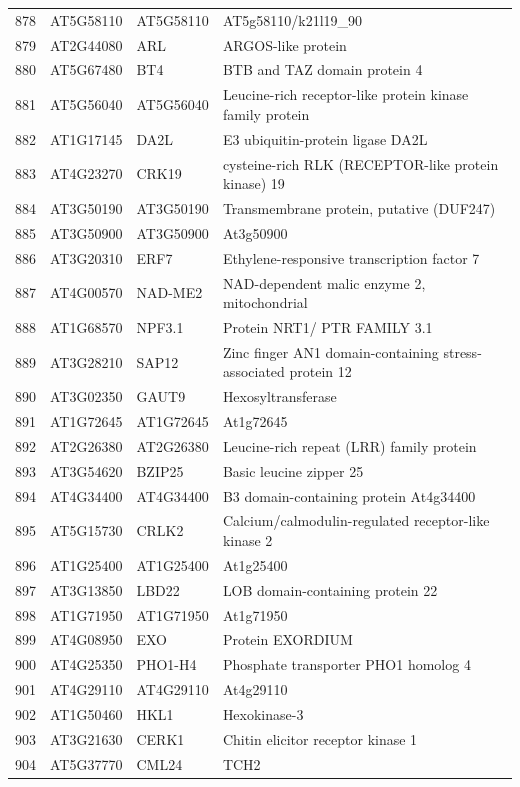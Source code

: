 \documentclass[11pt]{article}
\begin{document}
\begin{center}
\begin{tabular}{rlll}
878 & AT5G58110 & AT5G58110 & AT5g58110/k21l19\_90\\
879 & AT2G44080 & ARL & ARGOS-like protein\\
880 & AT5G67480 & BT4 & BTB and TAZ domain protein 4\\
881 & AT5G56040 & AT5G56040 & Leucine-rich receptor-like protein kinase family protein\\
882 & AT1G17145 & DA2L & E3 ubiquitin-protein ligase DA2L\\
883 & AT4G23270 & CRK19 & cysteine-rich RLK (RECEPTOR-like protein kinase) 19\\
884 & AT3G50190 & AT3G50190 & Transmembrane protein, putative (DUF247)\\
885 & AT3G50900 & AT3G50900 & At3g50900\\
886 & AT3G20310 & ERF7 & Ethylene-responsive transcription factor 7\\
887 & AT4G00570 & NAD-ME2 & NAD-dependent malic enzyme 2, mitochondrial\\
888 & AT1G68570 & NPF3.1 & Protein NRT1/ PTR FAMILY 3.1\\
889 & AT3G28210 & SAP12 & Zinc finger AN1 domain-containing stress-associated protein 12\\
890 & AT3G02350 & GAUT9 & Hexosyltransferase\\
891 & AT1G72645 & AT1G72645 & At1g72645\\
892 & AT2G26380 & AT2G26380 & Leucine-rich repeat (LRR) family protein\\
893 & AT3G54620 & BZIP25 & Basic leucine zipper 25\\
894 & AT4G34400 & AT4G34400 & B3 domain-containing protein At4g34400\\
895 & AT5G15730 & CRLK2 & Calcium/calmodulin-regulated receptor-like kinase 2\\
896 & AT1G25400 & AT1G25400 & At1g25400\\
897 & AT3G13850 & LBD22 & LOB domain-containing protein 22\\
898 & AT1G71950 & AT1G71950 & At1g71950\\
899 & AT4G08950 & EXO & Protein EXORDIUM\\
900 & AT4G25350 & PHO1-H4 & Phosphate transporter PHO1 homolog 4\\
901 & AT4G29110 & AT4G29110 & At4g29110\\
902 & AT1G50460 & HKL1 & Hexokinase-3\\
903 & AT3G21630 & CERK1 & Chitin elicitor receptor kinase 1\\
904 & AT5G37770 & CML24 & TCH2\\

\end{tabular}
\end{center}
\end{document}
